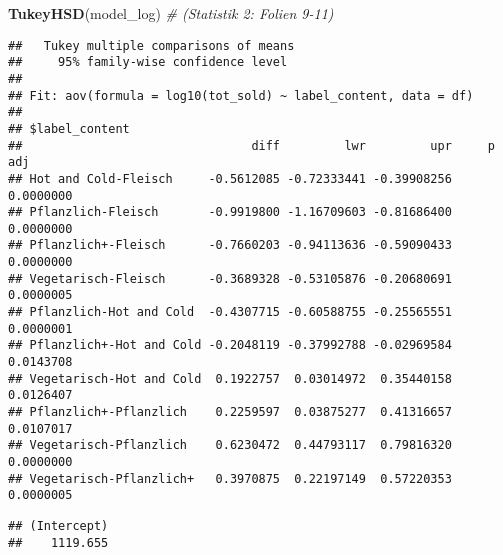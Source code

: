 \documentclass[]{article}
\newenvironment{Shaded}{\begin{snugshade}}{\end{snugshade}}
\newcommand{\CommentTok}[1]{\textcolor[rgb]{0.56,0.35,0.01}{\textit{#1}}}
\newcommand{\DecValTok}[1]{\textcolor[rgb]{0.00,0.00,0.81}{#1}}
\newcommand{\KeywordTok}[1]{\textcolor[rgb]{0.13,0.29,0.53}{\textbf{#1}}}
\newcommand{\NormalTok}[1]{#1}
\newcommand{\OperatorTok}[1]{\textcolor[rgb]{0.81,0.36,0.00}{\textbf{#1}}}
\newcommand{\StringTok}[1]{\textcolor[rgb]{0.31,0.60,0.02}{#1}}
\begin{document}
\begin{Shaded}
\begin{Highlighting}[]
\KeywordTok{TukeyHSD}\NormalTok{(model_log) }\CommentTok{# (Statistik 2: Folien 9-11)}
\end{Highlighting}
\end{Shaded}

\begin{verbatim}
##   Tukey multiple comparisons of means
##     95% family-wise confidence level
## 
## Fit: aov(formula = log10(tot_sold) ~ label_content, data = df)
## 
## $label_content
##                                diff         lwr         upr     p adj
## Hot and Cold-Fleisch     -0.5612085 -0.72333441 -0.39908256 0.0000000
## Pflanzlich-Fleisch       -0.9919800 -1.16709603 -0.81686400 0.0000000
## Pflanzlich+-Fleisch      -0.7660203 -0.94113636 -0.59090433 0.0000000
## Vegetarisch-Fleisch      -0.3689328 -0.53105876 -0.20680691 0.0000005
## Pflanzlich-Hot and Cold  -0.4307715 -0.60588755 -0.25565551 0.0000001
## Pflanzlich+-Hot and Cold -0.2048119 -0.37992788 -0.02969584 0.0143708
## Vegetarisch-Hot and Cold  0.1922757  0.03014972  0.35440158 0.0126407
## Pflanzlich+-Pflanzlich    0.2259597  0.03875277  0.41316657 0.0107017
## Vegetarisch-Pflanzlich    0.6230472  0.44793117  0.79816320 0.0000000
## Vegetarisch-Pflanzlich+   0.3970875  0.22197149  0.57220353 0.0000005
\end{verbatim}

\begin{Shaded}
\end{Shaded}

\begin{verbatim}
## (Intercept) 
##    1119.655
\end{verbatim}

\begin{Shaded}
\end{Shaded}
\end{document}
